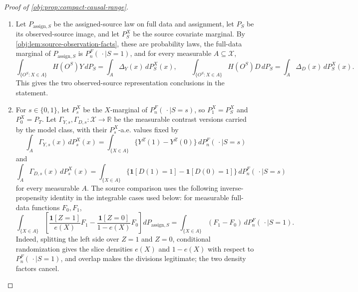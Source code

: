 \begin{proof}[Proof of \cref{obj:prop:compact-causal-range}]
\begin{enumerate}
\item Let \(P_{\mathrm{assign},S}\) be the assigned-source law on full data and assignment, let \(P_S\) be its observed-source image, and let \(P_S^X\) be the source covariate marginal.  By \cref{obj:lem:source-observation-facts}, these are probability laws, the full-data marginal of \(P_{\mathrm{assign},S}\) is \(P_n^F(\,\cdot\mid S=1)\), and for every measurable \(A\subseteq\mathcal X\),
\[
\int_{\{O^S:X\in A\}}H(O^S)Y\,dP_S
=
\int_A\Delta_Y(x)\,dP_S^X(x),
\qquad
\int_{\{O^S:X\in A\}}H(O^S)D\,dP_S
=
\int_A\Delta_D(x)\,dP_S^X(x).
\]
This gives the two observed-source representation conclusions in the statement. %

\item For \(s\in\{0,1\}\), let \(P_s^X\) be the \(X\)-marginal of \(P_n^F(\,\cdot\mid S=s)\), so \(P_1^X=P_S^X\) and \(P_0^X=P_T\).  Let \(\Gamma_{Y,s},\Gamma_{D,s}:\mathcal X\to\mathbb R\) be the measurable contrast versions carried by the model class, with their \(P_s^X\)-a.e. values fixed by
\[
\int_A \Gamma_{Y,s}(x)\,dP_s^X(x)
=
\int_{\{X\in A\}}\{Y^Z(1)-Y^Z(0)\}\,dP_n^F(\,\cdot\mid S=s)
\]
and
\[
\int_A \Gamma_{D,s}(x)\,dP_s^X(x)
=
\int_{\{X\in A\}}\{\mathbf 1[D(1)=1]-\mathbf 1[D(0)=1]\}\,dP_n^F(\,\cdot\mid S=s)
\]
for every measurable \(A\).  The source comparison uses the following inverse-propensity identity in the integrable cases used below: for measurable full-data functions \(F_0,F_1\),
\[
\int_{\{X\in A\}}
\left[
\frac{\mathbf 1[Z=1]}{e(X)}F_1
-
\frac{\mathbf 1[Z=0]}{1-e(X)}F_0
\right] dP_{\mathrm{assign},S}
=
\int_{\{X\in A\}}(F_1-F_0)\,dP_n^F(\,\cdot\mid S=1).
\]
Indeed, splitting the left side over \(Z=1\) and \(Z=0\), conditional randomization gives the slice densities \(e(X)\) and \(1-e(X)\) with respect to \(P_n^F(\,\cdot\mid S=1)\), and overlap makes the divisions legitimate; the two density factors cancel.


\end{enumerate}
\end{proof}
